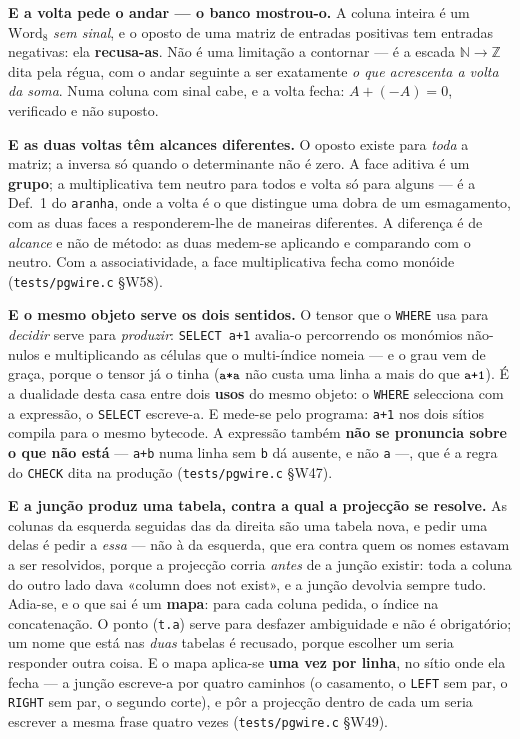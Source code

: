 \documentclass[11pt,a4paper]{article}
\newcommand{\code}[1]{\texttt{\small #1}}
\begin{document}
\medskip\noindent\textbf{E a volta pede o andar --- o banco mostrou-o.} A coluna
inteira é um $\text{Word}_8$ \emph{sem sinal}, e o oposto de uma matriz de
entradas positivas tem entradas negativas: ela \textbf{recusa-as}. Não é uma
limitação a contornar --- é a escada $\mathbb{N}\to\mathbb{Z}$ dita pela régua,
com o andar seguinte a ser exatamente \emph{o que acrescenta a volta da soma}.
Numa coluna com sinal cabe, e a volta fecha: $A+(-A)=0$, verificado e não
suposto.

\medskip\noindent\textbf{E as duas voltas têm alcances diferentes.} O oposto
existe para \emph{toda} a matriz; a inversa só quando o determinante não é zero.
A face aditiva é um \textbf{grupo}; a multiplicativa tem neutro para todos e
volta só para alguns --- é a Def.~1 do \code{aranha}, onde a volta é o que
distingue uma dobra de um esmagamento, com as duas faces a responderem-lhe de
maneiras diferentes. A diferença é de \emph{alcance} e não de método: as duas
medem-se aplicando e comparando com o neutro. Com a associatividade, a face
multiplicativa fecha como monóide (\code{tests/pgwire.c} §W58).

\medskip\noindent\textbf{E o mesmo objeto serve os dois sentidos.} O tensor que
o \code{WHERE} usa para \emph{decidir} serve para \emph{produzir}:
\code{SELECT a+1} avalia-o percorrendo os monómios não-nulos e multiplicando as
células que o multi-índice nomeia --- e o grau vem de graça, porque o tensor já
o tinha ($\code{a*a}$ não custa uma linha a mais do que $\code{a+1}$). É a
dualidade desta casa entre dois \textbf{usos} do mesmo objeto: o \code{WHERE}
selecciona com a expressão, o \code{SELECT} escreve-a. E mede-se pelo programa:
\code{a+1} nos dois sítios compila para o mesmo bytecode. A expressão também
\textbf{não se pronuncia sobre o que não está} --- \code{a+b} numa linha sem
\code{b} dá ausente, e não \code{a} ---, que é a regra do \code{CHECK} dita na
produção (\code{tests/pgwire.c} §W47).

\medskip\noindent\textbf{E a junção produz uma tabela, contra a qual a
projecção se resolve.} As colunas da esquerda seguidas das da direita são uma
tabela nova, e pedir uma delas é pedir a \emph{essa} --- não à da esquerda, que
era contra quem os nomes estavam a ser resolvidos, porque a projecção corria
\emph{antes} de a junção existir: toda a coluna do outro lado dava «column does
not exist», e a junção devolvia sempre tudo. Adia-se, e o que sai é um
\textbf{mapa}: para cada coluna pedida, o índice na concatenação. O ponto
(\code{t.a}) serve para desfazer ambiguidade e não é obrigatório; um nome que
está nas \emph{duas} tabelas é recusado, porque escolher um seria responder
outra coisa. E o mapa aplica-se \textbf{uma vez por linha}, no sítio onde ela
fecha --- a junção escreve-a por quatro caminhos (o casamento, o \code{LEFT} sem
par, o \code{RIGHT} sem par, o segundo corte), e pôr a projecção dentro de cada
um seria escrever a mesma frase quatro vezes (\code{tests/pgwire.c} §W49).
\end{document}
